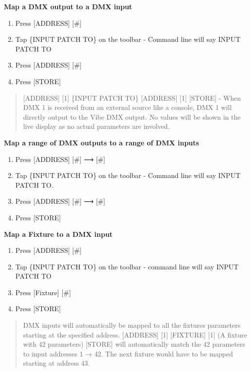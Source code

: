 \documentclass[
]{article}
\begin{document}
\textbf{Map a DMX output to a DMX input}

\begin{enumerate}
\def\labelenumi{\arabic{enumi}.}
\item
  Press {[}ADDRESS{]} {[}\#{]}
\item
  Tap \{INPUT PATCH TO\} on the toolbar - Command line will say INPUT PATCH TO
\item
  Press {[}ADDRESS{]} {[}\#{]}
\item
  Press {[}STORE{]}
\end{enumerate}

\begin{quote}
{[}ADDRESS{]} {[}1{]} \{INPUT PATCH TO\} {[}ADDRESS{]} {[}1{]} {[}STORE{]} - When DMX 1 is received from an external source like a console, DMX 1 will directly output to the Vibe DMX output. No values will be shown in the live display as no actual parameters are involved.
\end{quote}

\textbf{Map a range of DMX outputs to a range of DMX inputs}

\begin{enumerate}
\def\labelenumi{\arabic{enumi}.}
\item
  Press {[}ADDRESS{]} {[}\#{]} ⟶ {[}\#{]}
\item
  Tap \{INPUT PATCH TO\} on the toolbar - Command line will say INPUT PATCH TO.
\item
  Press {[}ADDRESS{]} {[}\#{]} ⟶ {[}\#{]}
\item
  Press {[}STORE{]}
\end{enumerate}

\textbf{Map a Fixture to a DMX input}

\begin{enumerate}
\def\labelenumi{\arabic{enumi}.}
\item
  Press {[}ADDRESS{]} {[}\#{]}
\item
  Tap \{INPUT PATCH TO\} on the toolbar - command line will say INPUT PATCH TO
\item
  Press {[}Fixture{]} {[}\#{]}
\item
  Press {[}STORE{]}
\end{enumerate}

\begin{quote}
DMX inputs will automatically be mapped to all the fixtures parameters starting at the specified address. {[}ADDRESS{]} {[}1{]} {[}FIXTURE{]} {[}1{]} (A fixture with 42 parameters) {[}STORE{]} will automatically match the 42 parameters to input addresses 1 → 42. The next fixture would have to be mapped starting at address 43.
\end{quote}
\end{document}
